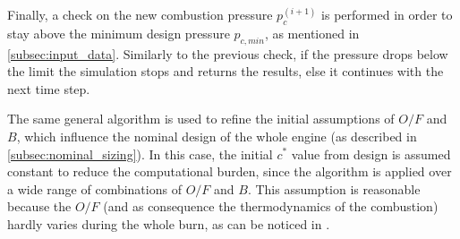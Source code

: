 Finally, a check on the new combustion pressure $p_c ^ {(i+1)}$ is performed in order to stay above the minimum design pressure $p_{c,min}$, as mentioned in \autoref{subsec:input_data}. Similarly to the previous check, if the pressure drops below the limit the simulation stops and returns the results, else it continues with the next time step.

\vspace*{3mm}

The same general algorithm is used to refine the initial assumptions of $O/F$ and $B$, which influence the nominal design of the whole engine (as described in \autoref{subsec:nominal_sizing}).
In this case, the initial $c^*$ value from design is assumed constant to reduce the computational burden, since the algorithm is applied over a wide range of combinations of $O/F$ and $B$. This assumption is reasonable because the $O/F$ (and as consequence the thermodynamics of the combustion) hardly varies during the whole burn, as can be noticed in \mref.